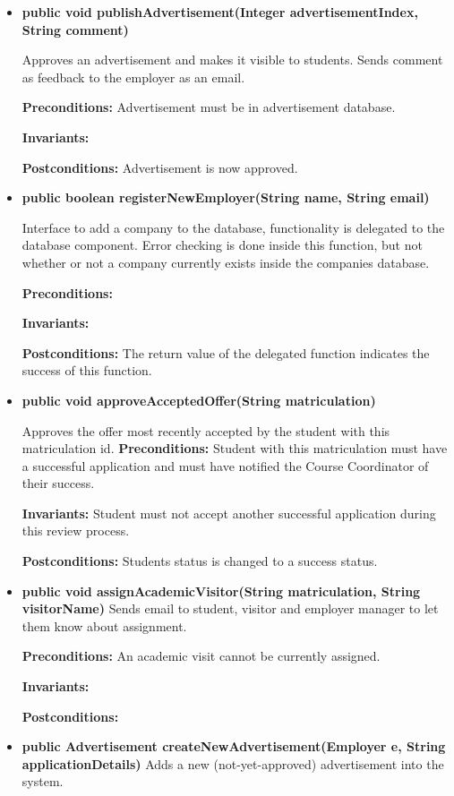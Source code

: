 \documentclass[11pt]{l3deliverable}
\begin{document}
\begin{itemize}

\item{\textbf{public void publishAdvertisement(Integer
    advertisementIndex, String comment)}

Approves an advertisement and makes it visible to students. Sends
comment as feedback to the employer as an email.

\textbf{Preconditions:} Advertisement must be in advertisement database.

\textbf{Invariants:}

\textbf{Postconditions:} Advertisement is now approved.}
\item{\textbf{public boolean registerNewEmployer(String name, String email)} 

Interface to add a company to the database, functionality is delegated to the
database component.
Error checking is done inside this function, but not whether or not a company
currently exists inside the companies database.

\textbf{Preconditions:} 

\textbf{Invariants:}

\textbf{Postconditions:} The return value of the delegated function indicates
the success of this function.}
\item{\textbf{public void approveAcceptedOffer(String matriculation)}

Approves the offer most recently accepted by the student with this matriculation
id. 
\textbf{Preconditions:} Student with this matriculation must have a successful
application and must have notified the Course Coordinator of their success.

\textbf{Invariants:} Student must not accept another successful application
during this review process.

\textbf{Postconditions:} Students status is changed to a success status.}
\item{\textbf{public void assignAcademicVisitor(String matriculation, String
    visitorName)}
Sends email to student, visitor and employer manager to let them know about
assignment. 

\textbf{Preconditions:} An academic visit cannot be currently assigned.

\textbf{Invariants:} 

\textbf{Postconditions:} }
\item{\textbf{public Advertisement createNewAdvertisement(Employer e,
      String applicationDetails)}
Adds a new (not-yet-approved) advertisement into the system.

}
\end{itemize}
\end{document}
